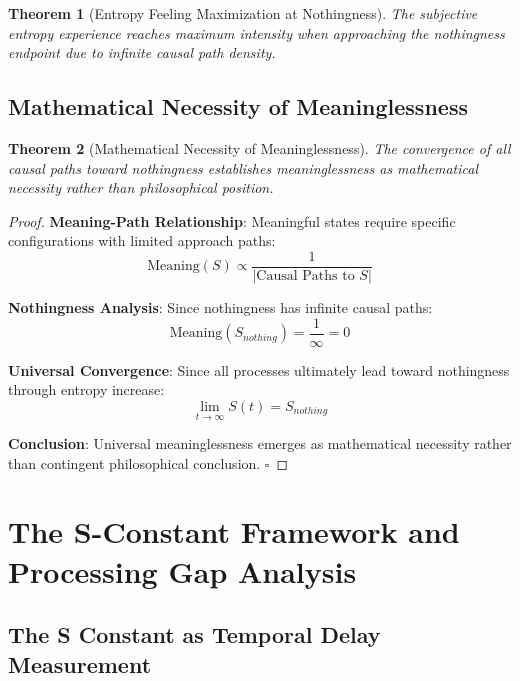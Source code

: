 \documentclass[12pt,a4paper]{article}
\newtheorem{theorem}{Theorem}
\begin{document}
\begin{theorem}[Entropy Feeling Maximization at Nothingness]
The subjective entropy experience reaches maximum intensity when approaching the nothingness endpoint due to infinite causal path density.
\end{theorem}

\subsection{Mathematical Necessity of Meaninglessness}

\begin{theorem}[Mathematical Necessity of Meaninglessness]
The convergence of all causal paths toward nothingness establishes meaninglessness as mathematical necessity rather than philosophical position.
\end{theorem}

\begin{proof}
\textbf{Meaning-Path Relationship}: Meaningful states require specific configurations with limited approach paths:
\begin{equation}
\text{Meaning}(S) \propto \frac{1}{|\text{Causal Paths to } S|}
\end{equation}

\textbf{Nothingness Analysis}: Since nothingness has infinite causal paths:
\begin{equation}
\text{Meaning}(S_{nothing}) = \frac{1}{\infty} = 0
\end{equation}

\textbf{Universal Convergence}: Since all processes ultimately lead toward nothingness through entropy increase:
\begin{equation}
\lim_{t \to \infty} S(t) = S_{nothing}
\end{equation}

\textbf{Conclusion}: Universal meaninglessness emerges as mathematical necessity rather than contingent philosophical conclusion. $\square$
\end{proof}

\section{The S-Constant Framework and Processing Gap Analysis}

\subsection{The S Constant as Temporal Delay Measurement}
\end{document}
